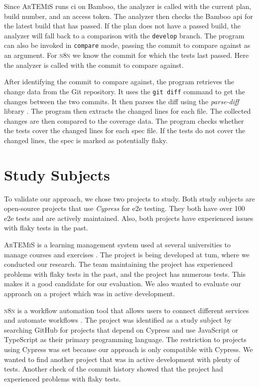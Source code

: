 Since \textsc{ArTEMiS} runs \ac{ci} on Bamboo, the analyzer is called with the current plan, build number, and an access token.
The analyzer then checks the Bamboo \ac{api} for the latest build that has passed.
If the plan does not have a passed build, the analyzer will fall back to a comparison with the \texttt{develop} branch.
The program can also be invoked in \texttt{compare} mode, passing the commit to compare against as an argument.
For \textsc{n8n} we know the commit for which the tests last passed.
Here the analyzer is called with the commit to compare against.

After identifying the commit to compare against, the program retrieves the change data from the Git repository.
It uses the \texttt{git diff} command to get the changes between the two commits.
It then parses the diff using the \textit{parse-diff} library \autocite{todyshev_parse-diff_2023}.
The program then extracts the changed lines for each file.
The collected changes are then compared to the coverage data.
The program checks whether the tests cover the changed lines for each spec file.
If the tests do not cover the changed lines, the spec is marked as potentially flaky.

\section{Study Subjects}
To validate our approach, we chose two projects to study.
Both study subjects are open-source projects that use \textit{Cypress} for \ac{e2e} testing.
They both have over 100 \ac{e2e} tests and are actively maintained.
Also, both projects have experienced issues with flaky tests in the past.

\textsc{ArTEMiS} is a learning management system used at several universities to manage courses and exercises \autocite{krusche_artemis_2018}.
The project is being developed at \ac{tum}, where we conducted our research.
The team maintaining the project has experienced problems with flaky tests in the past, and the project has numerous tests.
This makes it a good candidate for our evaluation.
We also wanted to evaluate our approach on a project which was in active development.

\textsc{n8n} is a workflow automation tool that allows users to connect different services and automate workflows \autocite{noauthor_n8n_2023}.
The project was identified as a study subject by searching GitHub for projects that depend on Cypress and use JavaScript or TypeScript as their primary programming language.
The restriction to projects using Cypress was set because our approach is only compatible with Cypress.
We wanted to find another project that was in active development with plenty of tests.
Another check of the commit history showed that the project had experienced problems with flaky tests.

